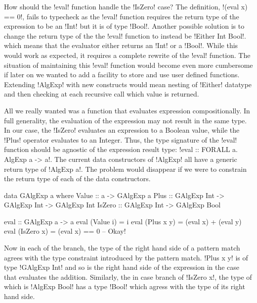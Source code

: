 \documentclass[manuscript,screen,nonacm]{acmart}
\begin{document}
How should the !eval! function handle the !IsZero! case? The definition, !(eval x) == 0!, fails to typecheck as the !eval! function requires the return type of the expression to be an !Int! but it is of type !Bool!. Another possible solution is to change the return type of the the !eval! function to instead be !Either Int Bool!. which means that the evaluator either returns an !Int! or a !Bool!. While this would work as expected, it requires a complete rewrite of the !eval! function. The situation of maintaining this !eval! function would become even more cumbersome if later on we wanted to add a facility to store and use user defined functions. Extending !AlgExp! with new constructs would mean nesting of !Either! datatype and then checking at each recursive call which value is returned.

All we really wanted was a function that evaluates expression compositionally. In full generality, the evaluation of the expression may not result in the same type. In our case, the !IsZero! evaluates an expression to a Boolean value, while the !Plus! operator evaluates to an Integer. Thus, the type signature of the !eval! function should be agnostic of the expression result type: !eval :: FORALL a. AlgExp a -> a!. The current data constructors of !AlgExp! all have a generic return type of !AlgExp a!. The problem would disappear if we were to constrain the return type of each of the data constructors.

\begin{minipage}[ht]{0.6\linewidth}
\begin{code}
data GAlgExp a where
  Value  ::  a                          -> GAlgExp a
  Plus   ::  GAlgExp Int -> GAlgExp Int -> GAlgExp Int
  IsZero ::  GAlgExp Int                -> GAlgExp Bool
\end{code}
\end{minipage}%
\begin{minipage}[ht]{0.4\linewidth}
\begin{code}
eval :: GAlgExp a -> a
eval (Value i)  = i
eval (Plus x y) = (eval x) + (eval y)
eval (IsZero x) = (eval x) == 0 -- Okay!
\end{code}
\end{minipage}%

Now in each of the branch, the type of the right hand side of a pattern match agrees with the type constraint introduced by the pattern match. !Plus x y! is of type !GAlgExp Int! and so is the right hand side of the expression in the case that evaluates the addition. Similarly, the in case branch of !IsZero x!, the type of which is !AlgExp Bool! has a type !Bool! which agress with the type of its right hand side.
\end{document}
